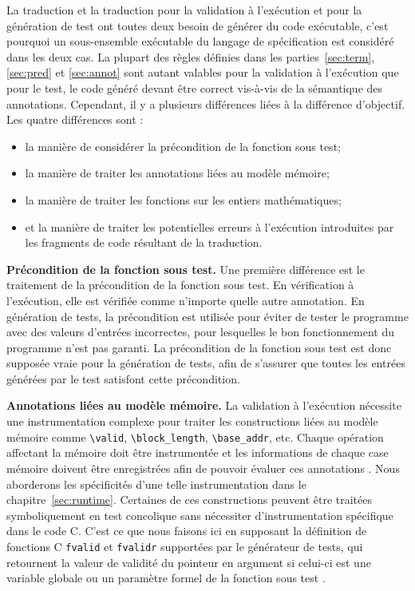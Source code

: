 La traduction et la traduction pour la validation à l'exécution et pour la
génération de test ont toutes deux besoin de générer du code exécutable, c'est
pourquoi un sous-ensemble exécutable du langage de spécification est considéré
dans les deux cas.
La plupart des règles définies dans les parties~\ref{sec:term},
\ref{sec:pred} et \ref{sec:annot} sont autant valables pour la validation à
l'exécution que pour le test, le code généré devant être correct vis-à-vis de la
sémantique des annotations.
Cependant, il y a plusieurs différences liées à la différence d'objectif.
Les quatre différences sont :
\begin{itemize}
\item la manière de considérer la précondition de la fonction sous test;
\item la manière de traiter les annotations liées au modèle mémoire;
\item la manière de traiter les fonctions sur les entiers mathématiques;
\item et la manière de traiter les potentielles erreurs à l'exécution
  introduites par les fragments de code résultant de la traduction.
\end{itemize}


\textbf{Précondition de la fonction sous test.}
Une première différence est le traitement de la précondition de la fonction sous
test.
En vérification à l'exécution, elle est vérifiée comme n'importe quelle autre
annotation.
En génération de tests, la précondition est utilisée pour éviter de tester le
programme avec des valeurs d'entrées incorrectes, pour lesquelles le bon
fonctionnement du programme n'est pas garanti.
La précondition de la fonction sous test est donc supposée vraie pour la
génération de tests, afin de s'assurer que toutes les entrées générées par le
test satisfont cette précondition.

\textbf{Annotations liées au modèle mémoire.}
La validation à l'exécution nécessite une instrumentation complexe pour traiter
les constructions \eacsl liées au modèle mémoire comme \lstinline'\valid',
\lstinline'\block_length', \lstinline'\base_addr', etc.
Chaque opération affectant la mémoire doit être instrumentée et les informations
de chaque case mémoire doivent être enregistrées afin de pouvoir évaluer ces
annotations \cite{Kosmatov/RV13}.
Nous aborderons les spécificités d'une telle instrumentation dans le
chapitre~\ref{sec:runtime}.
Certaines de ces constructions peuvent être traitées symboliquement en test
concolique sans nécessiter d'instrumentation spécifique dans le code C.
C'est ce que nous faisons ici en supposant la définition de fonctions C
\lstinline'fvalid' et \lstinline'fvalidr' supportées par le générateur de tests,
qui retournent la valeur de validité du pointeur en argument si celui-ci est
une variable globale ou un paramètre formel de la fonction sous test
\cite{Chebaro/ICSSEA12}.

